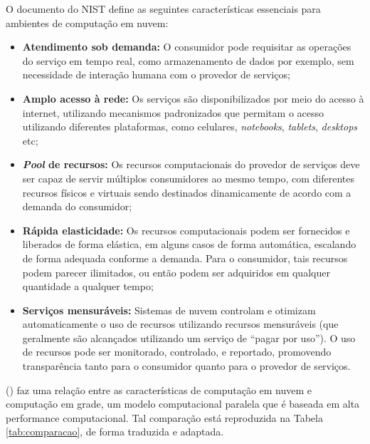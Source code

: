\documentclass[
	12pt,				%
	oneside,			%
	a4paper,			%
	chapter=TITLE,		%
	english,			%
	french,				%
	spanish,			%
	brazil				%
	]{abntex2}
\begin{document}
O documento do NIST define as seguintes características essenciais para ambientes de computação em nuvem:
\begin{itemize}
	\item \textbf{Atendimento sob demanda:} O consumidor pode requisitar as operações do serviço em tempo real, como armazenamento de dados por exemplo, sem necessidade de interação humana com o provedor de serviços;
	\item \textbf{Amplo acesso à rede:} Os serviços são disponibilizados por meio do acesso à internet, utilizando mecanismos padronizados que permitam o acesso utilizando diferentes plataformas, como celulares, \emph{notebooks}, \emph{tablets}, \emph{desktops} etc;
	\item \textbf{\emph{Pool} de recursos:} Os recursos computacionais do provedor de serviços deve ser capaz de servir múltiplos consumidores ao mesmo tempo, com diferentes recursos físicos e virtuais sendo destinados dinamicamente de acordo com a demanda do consumidor;
	\item \textbf{Rápida elasticidade:} Os recursos computacionais podem ser fornecidos e liberados de forma elástica, em alguns casos de forma automática, escalando de forma adequada conforme a demanda. Para o consumidor, tais recursos podem parecer ilimitados, ou então podem ser adquiridos em qualquer quantidade a qualquer tempo;
	\item \textbf{Serviços mensuráveis:} Sistemas de nuvem controlam e otimizam automaticamente o uso de recursos utilizando recursos mensuráveis (que geralmente são alcançados utilizando um serviço de ``pagar por uso''). O uso de recursos pode ser monitorado, controlado, e reportado, promovendo transparência tanto para o consumidor quanto para o provedor de serviços.
\end{itemize}

\citeauthor{gong2010characteristics} (\citeyear{gong2010characteristics}) faz uma relação entre as características de computação em nuvem e computação em grade, um modelo computacional paralela que é baseada em alta performance computacional. Tal comparação está reproduzida na Tabela \ref{tab:comparacao}, de forma traduzida e adaptada.
\end{document}
